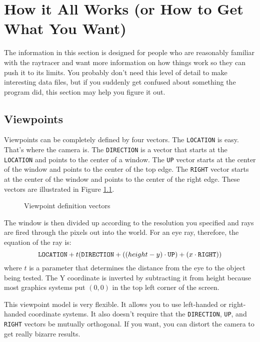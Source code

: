 \chapter{How it All Works (or How to Get What You Want)}

The information in this section is designed for people who are reasonably
familiar with the raytracer and want more information on how things work so
they can push it to its limits.  You probably don't need this level of detail
to make interesting data files, but if you suddenly get confused about
something the program did, this section may help you figure it out.

\section{Viewpoints}

Viewpoints can be completely defined by four vectors.  The
{\tt LOCATION} is easy.  That's where the camera
is. The {\tt DIRECTION}
is a vector that starts at the {\tt LOCATION} and points to the center
of a window.  The {\tt UP} vector starts at the center
of the window and points to the center of the top edge.  The
{\tt RIGHT} vector
starts at the center of the window and points to the center of the
right edge. These vectors are illustrated in Figure \ref{vectors}.
 
\begin{figure}[htbp]
\begin{centering}

\caption{Viewpoint definition vectors}
\label{vectors}
\end{centering}
\end{figure}

The window is then divided up according to the resolution you specified and
rays are fired through the pixels out into the world.  For an eye ray,
therefore, the equation of the ray is:
\begin{displaymath}
{\tt LOCATION} + t ({\tt DIRECTION} + ((height - y) \cdot {\tt UP}) +
(x \cdot {\tt RIGHT}))
\end{displaymath}
where $t$ is a parameter that determines the distance from the eye to the
object being tested.  The Y
coordinate is inverted by subtracting it from height because most
graphics systems put $(0,0)$ in the top left corner of the screen.

This viewpoint model is very flexible.  It allows you to use
left-handed or right-handed coordinate systems.  It also doesn't
require that the {\tt DIRECTION}, {\tt UP}, and {\tt RIGHT} vectors be
mutually orthogonal.  If you want, you can distort the camera to get
really bizarre results.

